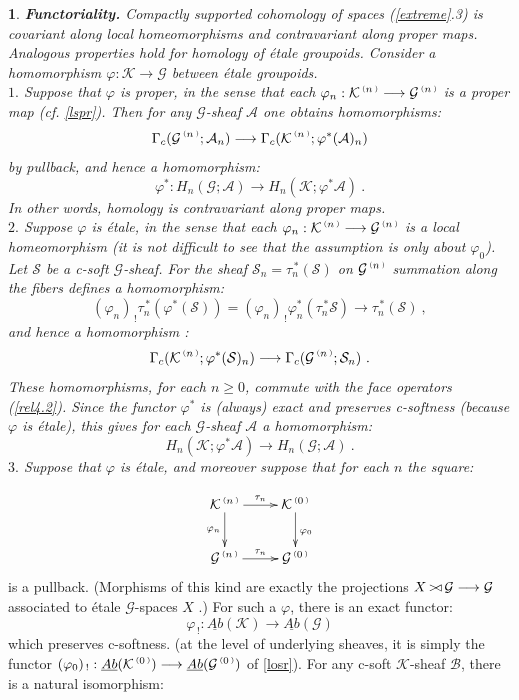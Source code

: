 \documentclass[a4paper]{article}
\newtheorem{num}[st]{}
\newcommand{\f}{\ensuremath{\varphi}}
\newcommand{\rmap}{\longrightarrow}
\newcommand{\Ka}{\ensuremath{\mathcal{K}}}
\newcommand{\G}{\ensuremath{\mathcal{G}}}
\newcommand{\A}{\ensuremath{\mathcal{A}}}
\newcommand{\es}{\ensuremath{\mathcal{S}}}
\newcommand{\B}{\ensuremath{\mathcal{B}}}
\newcommand{\abG}{\ensuremath{\underline{Ab}(\G)}}
\newcommand{\abK}{\ensuremath{\underline{Ab}(\Ka)}}
\newcommand{\gc}{\ensuremath{\Gamma_c}}
\newcommand{\ps}{{\raise 1pt\hbox{\tiny (}}}
\newcommand{\pd}{{\raise 1pt\hbox{\tiny )}}}
\newcommand{\nG}[1]{\ensuremath{\G^{\,\ps #1\,\pd}}}
\newcommand{\nK}[1]{\ensuremath{\Ka^{\,\ps #1\,\pd}}}
\def\cross{\mathinner{\mathrel{\raise0.8pt\hbox{$\scriptstyle>$}}
                 \joinrel\mathrel\triangleleft}}
\begin{document}
\begin{num}
\label{functor}
\emph{
{\bf Functoriality.} Compactly supported cohomology of spaces (\ref{extreme}.3) is covariant along local homeomorphisms and contravariant along proper maps. Analogous properties hold for homology of  \'etale groupoids. Consider a homomorphism $\f: \Ka\rmap \G$ between \'etale groupoids.\\
\hspace*{.3in} $1.$ Suppose that $\f$ is proper, in the sense that each $\f_{n}: \nK{n} \rmap \nG{n}$ is a proper map (cf. \ref{lspr}). Then for any $\G$-sheaf $\A$ one obtains homomorphisms:
\[ \gc(\nG{n}; \A_{n}) \rmap \gc (\nK{n}; \f^{*}(\A)_{n}) \]
by pullback, and hence a homomorphism:
\[ \f^{*}: H_{n}(\G; \A) \rmap H_{n}(\Ka; \f^{*}\A) \ .\]
In other words, homology is contravariant along proper maps.\\
\hspace*{.3in} $2.$ Suppose $\f$ is \'etale, in the sense that each $\f_{n}: \nK{n} \rmap \nG{n}$ is a local homeomorphism (it is not difficult to see that the assumption is only about $\f_0$). Let $\es$ be a c-soft $\G$-sheaf. For the sheaf $\es_{n}= \tau_{n}^{\, *}(\es)$ on $\nG{n}$  summation along the fibers defines a homomorphism: 
\[ (\f_{n})_{\, !}\tau_{n}^{\, *}(\f^{*}(\es)) = (\f_{n})_{\, !}\f_{n}^{*}(\tau_{n}^{\, *}\es) \rmap \tau_{n}^{\, *}(\es)\ ,\]
and hence a homomorphism :
\[ \gc (\nK{n}; \f^{*}(\es)_{n}) \rmap \gc (\nG{n}; \es_{n})\ .\]
These homomorphisms, for each $n \geq 0$, commute with the face operators (\ref{rel4.2}). Since the functor $\f^{*}$ is (always) exact and preserves c-softness (because $\f$ is \'etale), this gives for each $\G$-sheaf $\A$ a homomorphism:
\[ H_{n}(\Ka; \f^{*}\A) \rmap H_{n}(\G; \A) \ .\]
\hspace*{.3in} $3.$ Suppose that $\f$ is \'etale, and moreover suppose that for each $n$ the square:
}
\end{num}
\begin{equation}
\label{rel4.6}
\xymatrix {
 \nK{n} \ar[d]_-{\f_{n}} \ar[r]^-{\tau_{n}} & \nK{0} \ar[d]^{\f_{0}} \\
\nG{n} \ar[r]^-{\tau_{n}} & \nG{0}  } 
\end{equation}
is a pullback. (Morphisms of this kind are exactly the projections $X\cross\G \rmap \G$ associated to \'etale $\G$-spaces $X$ .) For such a $\f$, there is an exact functor:
\[ \f_{\, !}: \abK \rmap \abG \]
which preserves c-softness. (at the level of underlying sheaves, it is simply the functor $(\f_{0})_{\, !}: \underline{Ab}(\nK{0}) \rmap \underline{Ab}(\nG{0})$ of \ref{losr}). For any c-soft $\Ka$-sheaf $\B$, there is a natural isomorphism: 
\end{document}
